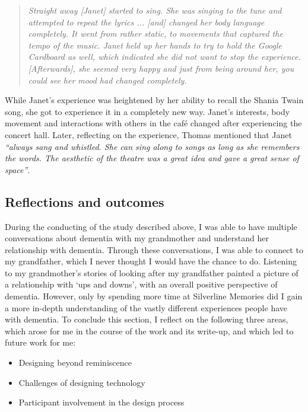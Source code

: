 \begin{quote}
\textit{Straight away [Janet] started to sing. She was singing to the tune and attempted to repeat the lyrics ... [and] changed her body language completely. It went from rather static, to movements that captured the tempo of the music. Janet held up her hands to try to hold the Google Cardboard as well, which indicated she did not want to stop the experience. [Afterwards], she seemed very happy and just from being around her, you could see her mood had changed completely.}    
\end{quote}

While Janet’s experience was heightened by her ability to recall the Shania Twain song, she got to experience it in a completely new way. Janet’s interests, body movement and interactions with others in the café changed after experiencing the concert hall. Later, reflecting on the experience, Thomas mentioned that Janet \textit{``always sang and whistled. She can sing along to songs as long as she remembers the words. The aesthetic of the theatre was a great idea and gave a great sense of space''}.

\subsection{Reflections and outcomes}
\label{S1:ReflectionsOutcomes}
During the conducting of the study described above, I was able to have multiple conversations about dementia with my grandmother and understand her relationship with dementia. Through these conversations, I was able to connect to my grandfather, which I never thought I would have the chance to do. Listening to my grandmother's stories of looking after my grandfather painted a picture of a relationship with `ups and downs', with an overall positive perspective of dementia. However, only by spending more time at Silverline Memories did I gain a more in-depth understanding of the vastly different experiences people have with dementia. To conclude this section, I reflect on the following three areas, which arose for me in the course of the work and its write-up, and which led to future work for me:
\begin{itemize}
    \item Designing beyond reminiscence
    \item Challenges of designing technology
    \item Participant involvement in the design process
\end{itemize}

